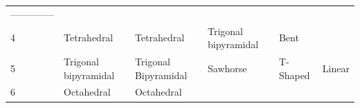 \documentclass[]{article}
\begin{document}
\begin{longtable}[]{@{}llllll@{}}
\begin{minipage}[t]{0.09\columnwidth}
--------------\strut
\end{minipage}\tabularnewline
\begin{minipage}[t]{0.20\columnwidth}\raggedright\strut
4\strut
\end{minipage} & \begin{minipage}[t]{0.16\columnwidth}\raggedright\strut
Tetrahedral\strut
\end{minipage} & \begin{minipage}[t]{0.14\columnwidth}\raggedright\strut
Tetrahedral\strut
\end{minipage} & \begin{minipage}[t]{0.15\columnwidth}\raggedright\strut
Trigonal bipyramidal\strut
\end{minipage} & \begin{minipage}[t]{0.10\columnwidth}\raggedright\strut
Bent\strut
\end{minipage} & \begin{minipage}[t]{0.09\columnwidth}\raggedright\strut
\strut
\end{minipage}\tabularnewline
\begin{minipage}[t]{0.20\columnwidth}\raggedright\strut
5\strut
\end{minipage} & \begin{minipage}[t]{0.16\columnwidth}\raggedright\strut
Trigonal bipyramidal\strut
\end{minipage} & \begin{minipage}[t]{0.14\columnwidth}\raggedright\strut
Trigonal Bipyramidal\strut
\end{minipage} & \begin{minipage}[t]{0.15\columnwidth}\raggedright\strut
Sawhorse\strut
\end{minipage} & \begin{minipage}[t]{0.10\columnwidth}\raggedright\strut
T-Shaped\strut
\end{minipage} & \begin{minipage}[t]{0.09\columnwidth}\raggedright\strut
Linear\strut
\end{minipage}\tabularnewline
\begin{minipage}[t]{0.20\columnwidth}\raggedright\strut
6\strut
\end{minipage} & \begin{minipage}[t]{0.16\columnwidth}\raggedright\strut
Octahedral\strut
\end{minipage} & \begin{minipage}[t]{0.14\columnwidth}\raggedright\strut
Octahedral\strut
\end{minipage} & \begin{minipage}[t]{0.15\columnwidth}\raggedright\strut

\end{minipage}
\end{longtable}
\end{document}
